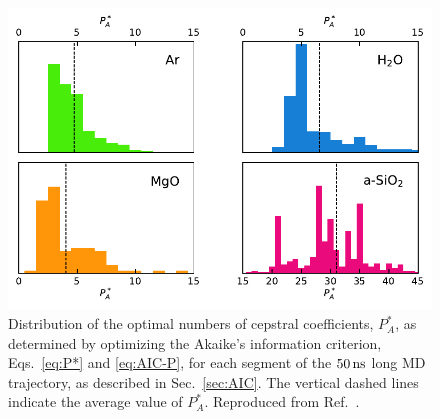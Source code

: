 \begin{figure}[!tb]
    \centering
    \includegraphics[width=\textwidth]{chapters/chapter5/figures/Pstar_distribution.pdf}
    \caption{Distribution of the optimal numbers of cepstral coefficients, $P_A^*$, as determined by optimizing the Akaike's information criterion, Eqs.~\eqref{eq:P*} and \eqref{eq:AIC-P}, for each segment of the $50\,\mathrm{ns}$ long MD trajectory, as described in Sec.~\ref{sec:AIC}. The vertical dashed lines indicate the average value of $P_A^*$. Reproduced from Ref.~\cite{Ercole2017}.
    }
    \label{fig:Pstar_distribution}
\end{figure}


